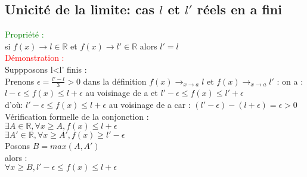 \documentclass{article}
\begin{document}
\subsection{Unicité de la limite: cas $l$ et $l'$ réels en a fini}
\textcolor{green}{Propriété :} \\ 
si $f(x) \rightarrow l \in \mathbb{R}$ et $f(x) \rightarrow l' \in \mathbb{R}$ alors $l'=l$ \\ 
\textcolor{red}{Démonstration :} \\ 
Suppposons l<l' finis : \\ 
Prenons $\epsilon=\frac{l'-l}{3}>0$ dans la définition $f(x) \rightarrow_{x \rightarrow a} l$ et $f(x) \rightarrow_{x \rightarrow a} l'$ :
on a : \\ 
$l-\epsilon \leq f(x) \leq l +\epsilon$ au voisinage de a et $l'-\epsilon \leq f(x) \leq l' +\epsilon$ \\ 
d'où: $l'- \epsilon \leq f(x) \leq l+ \epsilon$ au voisinage de a car : 
$(l'-\epsilon)-(l+\epsilon)= \epsilon > 0$ \\ 
Vérification formelle de la conjonction : \\ 
$\exists A \in \mathbb{R}, \forall x \geq A,f(x) \leq l+ \epsilon$ \\ 
$\exists A' \in \mathbb{R}, \forall x \geq A',f(x) \geq l'- \epsilon$ \\ 
Posons $B=max(A,A')$ \\ 
alors :\\ 
$\forall x \geq B , l'- \epsilon \leq f(x) \leq l + \epsilon$
\end{document}
